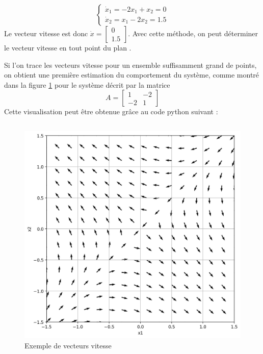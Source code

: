         \begin{equation}
            \begin{cases}
                \dot{x}_1 = -2x_1 + x_2 = 0 \\
                \dot{x}_2 = x_1 - 2x_2 = 1.5
            \end{cases}
        \end{equation}
        Le vecteur vitesse est donc $\dot{x} = \begin{bmatrix} 0\\ 1.5\end{bmatrix} $. 
        Avec cette méthode, on peut déterminer le vecteur vitesse en tout point du plan . 
        
        Si l'on trace les vecteurs vitesse pour un ensemble suffisamment grand de points, on obtient une première estimation du comportement du système, comme montré dans la figure \ref{fig:vecteurs_vitesse} pour le système décrit par la matrice 
        \begin{equation}
            A = \begin{bmatrix}1 & -2\\-2 & 1\end{bmatrix}
        \end{equation}
        Cette visualisation peut être obtenue grâce au code python suivant :
        \inputminted{python}{codes/vecteurs_vitesse.py}
        
        \begin{figure}[ht!]
            \centering
            \includegraphics[width=\textwidth]{images/vecteurs_vitesse.jpg}
            \caption{Exemple de vecteurs vitesse}
            \label{fig:vecteurs_vitesse}
        \end{figure}

